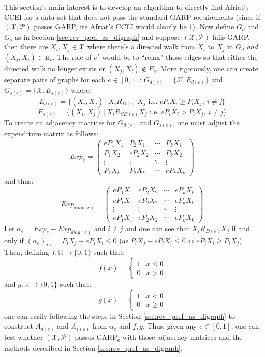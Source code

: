 \documentclass{article} %
\theoremstyle{style1}
\theoremstyle{style1}
\theoremstyle{example}
\begin{document}
This section's main interest is to develop an algorithm to directly find Afriat's CCEI for a data set that does not pass the standard GARP requirements (since if $(\mathcal{X},\mathcal{P})$ passes GARP, its Afriat's CCEI would clearly be 1). Now define $G_d$ and $G_s$ as in Section \ref{sec:rev_pref_as_digraph} and suppose $(\mathcal{X},\mathcal{P})$ fails GARP, then there are $X_i,X_j\in\mathcal{X}$ where there's a directed walk from $X_i$ to $X_j$ in $G_d$ \emph{and} $(X_j,X_i)\in E_s$. The role of $e^*$ would be to ``relax'' those edges so that either the directed walk no longer exists or $(X_j,X_i)\not\in E_s$. More rigorously, one can create separate pairs of graphs for each $e\in[0,1]$: $G_{d(e)}=\{\mathcal{X},E_{d(e)}\}$ and $G_{s(e)}=\{\mathcal{X},E_{s(e)}\}$ where:
$$E_{d(e)}=\{(X_i,X_j)\ |\ X_iR_{D(e)}X_j\textrm{ i.e. } eP_iX_i\geq P_iX_j,\ i\not=j\}$$
$$E_{s(e)}=\{(X_i,X_j)\ |\ X_iR_{SD(e)}X_j\textrm{ i.e. } eP_iX_i> P_iX_j,\ i\not=j\}$$
To create an adjacency matrices for $G_{d(e)}$ and $G_{s(e)}$, one must adjust the expenditure matrix as follows:
\[
Exp_e=
\begin{pmatrix}
eP_1X_1 & P_2X_1 & \cdots & P_kX_1\\
P_1X_2 & eP_2X_2 & \cdots & P_kX_2\\
\vdots & \vdots & \ddots & \vdots \\
P_1X_k & P_2X_k & \cdots & eP_kX_k 
\end{pmatrix}
\]
and thus:
\[
Exp_{diag(e)}=
\begin{pmatrix}
eP_1X_1 & eP_2X_2 & \cdots & eP_kX_k \\
eP_1X_1 & eP_2X_2 & \cdots & eP_kX_k \\
\vdots & \vdots & \ddots & \vdots \\
eP_1X_1 & eP_2X_2 & \cdots & eP_kX_k 
\end{pmatrix}
\]
Let $\alpha_e=Exp_e-Exp_{diag(e)}$ and $i\not=j$ and one can see that $X_i R_{D(e)} X_j$ if and only if $(\alpha_e)_{j,i}=P_iX_j-eP_iX_i\leq0$ (as $P_iX_j-eP_iX_i\leq0 \iff eP_iX_i\geq P_iX_j$). Then, defining $f:\mathbb{R}\to\{0,1\}$ such that:
\[f(x)=\begin{cases}
1 & x\leq 0\\
0 & x>0
\end{cases}
\]
and $g:\mathbb{R}\to\{0,1\}$ such that:
\[g(x)=\begin{cases}
1 & x<0\\
0 & x\geq0
\end{cases}
\]
one can easily following the steps in Section \ref{sec:rev_pref_as_digraph} to construct $A_{d(e)}$ and $A_{s(e)}$ from $\alpha_e$ and $f, g$. Thus, given any $e\in[0,1]$, one can test whether $(\mathcal{X},\mathcal{P})$ passes GARP\textsubscript{e} with those adjacency matrices and the methods described in Section \ref{sec:rev_pref_as_digraph}.
\end{document}
